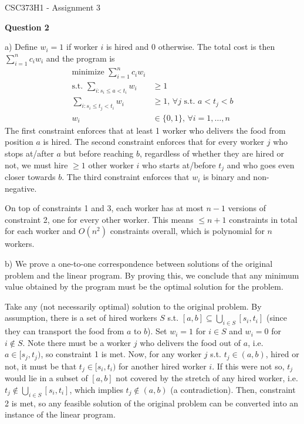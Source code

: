 \documentclass[11pt]{article}
\begin{document}
\begin{center}
    {\Large CSC373H1 - Assignment 3}
\end{center}

\textbf{Question 2}

a) Define $w_i=1$ if worker $i$ is hired and $0$ otherwise. The total cost is then $\sum_{i=1}^n c_i w_i$ and the program is \begin{align*}
    \text{minimize }\sum_{i=1}^n c_i w_i\\
    \text{s.t. }\sum_{i:s_i\leq a<t_i} w_i &\geq 1\\
    \sum_{i:s_i\leq t_j<t_i} w_i &\geq 1 \text{, }\forall j \text{ s.t. } a<t_j<b\\
    w_i &\in\{0,1\}\text{, }\forall i=1,\ldots,n
\end{align*} The first constraint enforces that at least 1 worker who delivers the food from position $a$ is hired. The second constraint enforces that for every worker $j$ who stops at/after $a$ but before reaching $b$, regardless of whether they are hired or not, we must hire $\geq 1$ other worker $i$ who starts at/before $t_j$ and who goes even closer towards $b$. The third constraint enforces that $w_i$ is binary and non-negative.

On top of constraints 1 and 3, each worker has at most $n-1$ versions of constraint 2, one for every other worker. This means $\leq n+1$ constraints in total for each worker and $O(n^2)$ constraints overall, which is polynomial for $n$ workers.

b) We prove a one-to-one correspondence between solutions of the original problem and the linear program. By proving this, we conclude that any minimum value obtained by the program must be the optimal solution for the problem.

Take any (not necessarily optimal) solution to the original problem. By assumption, there is a set of hired workers $S$ s.t. $[a,b]\subseteq \bigcup_{i\in S} [s_i,t_i]$ (since they can transport the food from $a$ to $b$). Set $w_i=1$ for $i\in S$ and $w_i=0$ for $i\notin S$. Note there must be a worker $j$ who delivers the food out of $a$, i.e. $a\in [s_j,t_j)$, so constraint 1 is met. Now, for any worker $j$ s.t. $t_j\in (a,b)$, hired or not, it must be that $t_j\in [s_i,t_i)$ for another hired worker $i$. If this were not so, $t_j$ would lie in a subset of $[a,b]$ not covered by the stretch of any hired worker, i.e. $t_j\notin \bigcup_{i\in S} [s_i,t_i]$, which implies $t_j\notin (a,b)$ (a contradiction). Then, constraint 2 is met, so any feasible solution of the original problem can be converted into an instance of the linear program.
\end{document}
